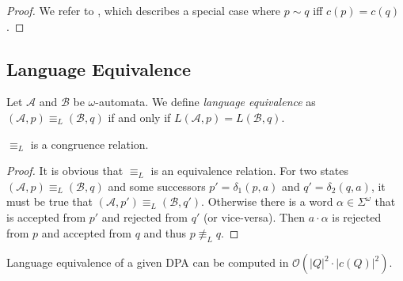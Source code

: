 \begin{proof}
	We refer to \cite{Hopcroft1971}, which describes a special case where $p \sim q$ iff $c(p) = c(q)$.
\end{proof}

\vspace{5pt}

\subsection{Language Equivalence}

\begin{defn}
	Let $\mathcal{A}$ and $\mathcal{B}$ be $\omega$-automata. We define \emph{language equivalence} as $(\mathcal{A}, p) \equiv_L (\mathcal{B}, q)$ if and only if $L(\mathcal{A}, p) = L(\mathcal{B}, q)$.
\end{defn}

\begin{lem}
	$\equiv_L$ is a congruence relation.
	\label{lem:general:L_congruence}
\end{lem}

\begin{proof}
	It is obvious that $\equiv_L$ is an equivalence relation. For two states $(\mathcal{A}, p) \equiv_L (\mathcal{B}, q)$ and some successors $p' = \delta_1(p, a)$ and $q' = \delta_2(q, a)$, it must be true that $(\mathcal{A}, p') \equiv_L (\mathcal{B}, q')$. Otherwise there is a word $\alpha \in \Sigma^\omega$ that is accepted from $p'$ and rejected from $q'$ (or vice-versa). Then $a \cdot \alpha$ is rejected from $p$ and accepted from $q$ and thus $p \not\equiv_L q$.
\end{proof}

\begin{lem}
	Language equivalence of a given DPA can be computed in $\mathcal{O}(|Q|^2 \cdot |c(Q)|^2)$.
\end{lem}

